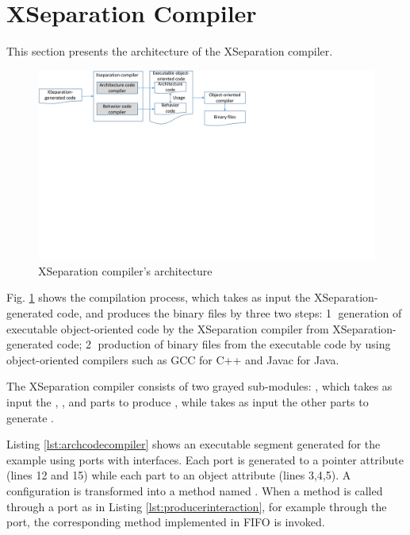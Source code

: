 \section{XSeparation Compiler}
\label{sec:compilation}
This section presents the architecture of the XSeparation compiler. %
\begin{figure}
	\centering
	\includegraphics[clip, trim=0cm 13.3cm 12.8cm 0cm, width=\columnwidth]{figures/compilerarchitecture.pdf}
	\caption{XSeparation compiler's architecture} 
	\label{fig:compilerarchitecture}
\end{figure}
Fig. \ref{fig:compilerarchitecture} shows the compilation process, which takes as input the XSeparation-generated code, and produces the binary files by three two steps: \textcircled{1} generation of executable object-oriented code by the XSeparation compiler from XSeparation-generated code; \textcircled{2} production of binary files from the executable code by using object-oriented compilers such as GCC for C++ and Javac for Java.

The XSeparation compiler consists of two grayed sub-modules: , which takes as input the , , and  parts to produce , while  takes as input the other parts to generate . 



\vskip 0.1cm
\noindent
{}
Listing \ref{lst:archcodecompiler} shows an executable  segment generated for the  example using ports with interfaces.
Each port is generated to a pointer attribute (lines 12 and 15) while each part to an object attribute (lines 3,4,5).
A configuration is transformed into a method named .
When a method is called through a port as in Listing \ref{lst:producerinteraction}, for example  through the  port, the corresponding method implemented in FIFO is invoked. 

